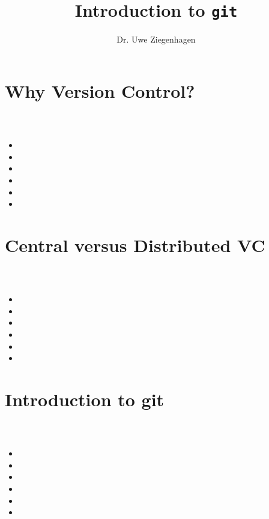 \documentclass[12pt,ngerman]{beamer}
\title{Introduction to \texttt{git}}
\author{Dr. Uwe Ziegenhagen}
\institute{\url{www.uweziegenhagen.de}}
\begin{document}
\begin{frame}

\maketitle

\end{frame}

\begin{frame}

\tableofcontents

\end{frame}

\section{Why Version Control?}

\begin{frame}
\frametitle{}
\framesubtitle{~}

\begin{itemize}
\item 
\item 
\item 
\item 
\item 
\item 
\end{itemize}
\end{frame}

\section{Central versus Distributed VC}

\begin{frame}
\frametitle{}
\framesubtitle{~}

\begin{itemize}
\item 
\item 
\item 
\item 
\item 
\item 
\end{itemize}
\end{frame}

\section{Introduction to git}

\begin{frame}
\frametitle{}
\framesubtitle{~}

\begin{itemize}
\item 
\item 
\item 
\item 
\item 
\item 
\end{itemize}
\end{frame}
\end{document}
